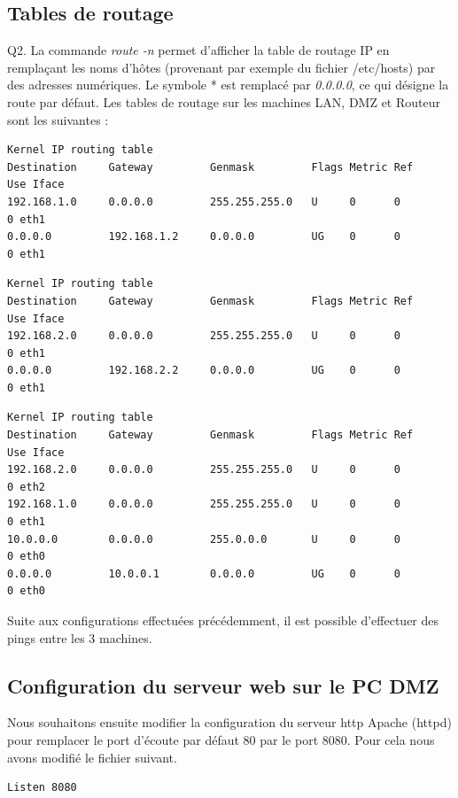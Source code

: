 \documentclass[frenchb, 11pt]{article}
\newlength{\leftbarwidth}
\newlength{\leftbarsep}
\newcommand*{\leftbarcolorcmd}{\color{leftbarcolor}} %
\renewenvironment{leftbar}{%
    \def\FrameCommand{{\leftbarcolorcmd{\vrule width \leftbarwidth\relax\hspace {\leftbarsep}}}}%
    \MakeFramed {\advance \hsize -\width \FrameRestore }%
}{%
    \endMakeFramed
}
\begin{document}
\subsection{Tables de routage}
\begin{leftbar}
	\noindent Q2. La commande \emph{route -n} permet d'afficher la table de routage IP en remplaçant les noms d'hôtes (provenant par exemple du fichier /etc/hosts) par des adresses numériques. Le symbole * est remplacé par \emph{0.0.0.0}, ce qui désigne la route par défaut. Les tables de routage sur les machines LAN, DMZ et Routeur sont les suivantes :
	\begin{lstlisting}[caption=Table de routage LAN, numbers=none]
Kernel IP routing table
Destination     Gateway         Genmask         Flags Metric Ref    Use Iface
192.168.1.0     0.0.0.0         255.255.255.0   U     0      0        0 eth1
0.0.0.0         192.168.1.2     0.0.0.0         UG    0      0        0 eth1
	\end{lstlisting}
	\begin{lstlisting}[caption=Table de routage DMZ, numbers=none]
Kernel IP routing table
Destination     Gateway         Genmask         Flags Metric Ref    Use Iface
192.168.2.0     0.0.0.0         255.255.255.0   U     0      0        0 eth1
0.0.0.0         192.168.2.2     0.0.0.0         UG    0      0        0 eth1
	\end{lstlisting}
	\begin{lstlisting}[caption=Table de routage Routeur, numbers=none]
Kernel IP routing table
Destination     Gateway         Genmask         Flags Metric Ref    Use Iface
192.168.2.0     0.0.0.0         255.255.255.0   U     0      0        0 eth2
192.168.1.0     0.0.0.0         255.255.255.0   U     0      0        0 eth1
10.0.0.0        0.0.0.0         255.0.0.0       U     0      0        0 eth0
0.0.0.0         10.0.0.1        0.0.0.0         UG    0      0        0 eth0
	\end{lstlisting}
\end{leftbar}

Suite aux configurations effectuées précédemment, il est possible d'effectuer des pings entre les 3 machines.\\

\subsection{Configuration du serveur web sur le PC DMZ}
Nous souhaitons ensuite modifier la configuration du serveur http Apache (httpd) pour remplacer le port d'écoute par défaut 80 par le port 8080. Pour cela nous avons modifié le fichier suivant.
\begin{lstlisting}[caption=/etc/httpd/conf/httpd.conf]
Listen 8080
\end{lstlisting}
\hfill
\end{document}
